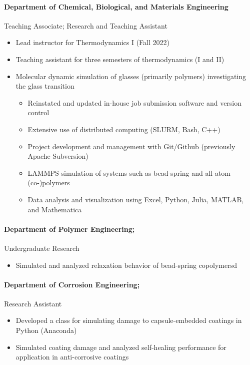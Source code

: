 \documentclass{my_cv}
\begin{document}
\paragraph{Department of Chemical, Biological, and Materials Engineering\\}
Teaching Associate; Research and Teaching Assistant
\begin{itemize}
    \item Lead instructor for Thermodynamics I (Fall 2022)
    \item Teaching assistant for three semesters of thermodynamics (I and II)
    \item Molecular dynamic simulation of glasses (primarily polymers) investigating the glass transition
    \begin{itemize}
        \item Reinstated and updated in-house job submission software and version control
        \item Extensive use of distributed computing (SLURM, Bash, C++)
        \item Project development and management with Git/Git\-hub (previously Apache Subversion)
        \item LAMMPS simulation of systems such as bead-spring and all-atom (co-)polymers
        \item Data analysis and visualization using Excel, Python, Julia, MATLAB, and Math\-e\-ma\-ti\-ca
    \end{itemize}
\end{itemize}

\paragraph{Department of Polymer Engineering;}
Undergraduate Research
\begin{itemize}
    \item Simulated and analyzed relaxation behavior of bead-spring co\-polymersd
\end{itemize}

\paragraph{Department of Corrosion Engineering;}
Research Assistant
\begin{itemize}
    \item Developed a class for simulating damage to capsule-embedded coatings in Python (Anaconda)
    \item Simulated coating damage and analyzed self-healing performance for application in anti-corrosive coatings
\end{itemize}
\end{document}
